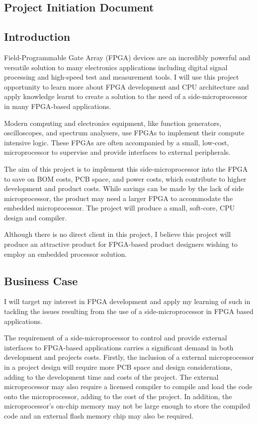 
\subsection{Project Initiation Document}
\subsection*{Introduction}
Field-Programmable Gate Array (FPGA) devices are an incredibly powerful and versatile solution to many electronics applications including digital signal processing and high-speed test and measurement tools. I will use this project opportunity to learn more about FPGA development and CPU architecture and apply knowledge learnt to create a solution to the need of a side-microprocessor in many FPGA-based applications.

Modern computing and electronics equipment, like function generators, oscilloscopes, and spectrum analysers, use FPGAs to implement their compute intensive logic. These FPGAs are often accompanied by a small, low-cost, microprocessor to supervise and provide interfaces to external peripherals.

The aim of this project is to implement this side-microprocessor into the FPGA to save on BOM costs, PCB space, and power costs, which contribute to higher development and product costs. While savings can be made by the lack of side microprocessor, the product may need a larger FPGA to accommodate the embedded microprocessor. The project will produce a small, soft-core, CPU design and compiler.

Although there is no direct client in this project, I believe this project will produce an attractive product for FPGA-based product designers wishing to employ an embedded processor solution.

\subsection*{Business Case}
I will target my interest in FPGA development and apply my learning of such in tackling the issues resulting from the use of a side-microprocessor in FPGA based applications.

The requirement of a side-microprocessor to control and provide external interfaces to FPGA-based applications carries a significant demand in both development and projects costs. Firstly, the inclusion of a external microprocessor in a project design will require more PCB space and design considerations, adding to the development time and costs of the project. The external microprocessor may also require a licensed compiler to compile and load the code onto the microprocessor, adding to the cost of the project. In addition, the  microprocessor's on-chip memory may not be large enough to store the compiled code and an external flash memory chip may also be required.

